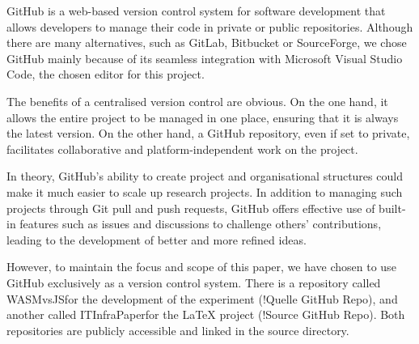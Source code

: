 GitHub is a web-based version control system for software development that allows developers to manage their code in private or public repositories. Although there are many alternatives, such as GitLab, Bitbucket or SourceForge, we chose GitHub mainly because of its seamless integration with Microsoft Visual Studio Code, the chosen editor for this project.

The benefits of a centralised version control are obvious. On the one hand, it allows the entire project to be managed in one place, ensuring that it is always the latest version. On the other hand, a GitHub repository, even if set to private, facilitates collaborative and platform-independent work on the project.

In theory, GitHub's ability to create project and organisational structures could make it much easier to scale up research projects. In addition to managing such projects through Git pull and push requests, GitHub offers effective use of built-in features such as issues and discussions to challenge others' contributions, leading to the development of better and more refined ideas.

However, to maintain the focus and scope of this paper, we have chosen to use GitHub exclusively as a version control system. There is a repository called \dq WASMvsJS\dq  for the development of the experiment (!Quelle GitHub Repo), and another called \dq ITInfraPaper\dq  for the \LaTeX{} project (!Source GitHub Repo). Both repositories are publicly accessible and linked in the source directory.